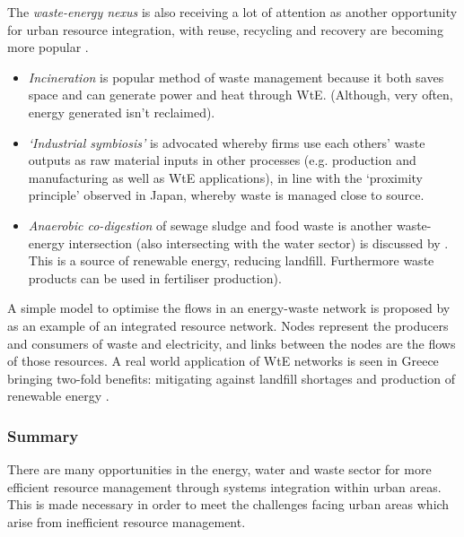 The \emph{waste-energy nexus} is also receiving a lot of attention as another opportunity for urban resource integration, with reuse, recycling and recovery are becoming more popular \citep{Geng2010}. 
\begin{itemize} 
	\item \emph{Incineration} is popular method of waste management because it both saves space and can generate power and heat through WtE. (Although, very often, energy generated isn't reclaimed).  
	\item \emph{`Industrial symbiosis'} is advocated whereby firms use each others' waste outputs as raw material inputs in other processes (e.g. production and manufacturing as well as WtE applications), in line with the `proximity principle' observed in Japan, whereby waste is managed close to source. %
	\item \emph{Anaerobic co-digestion} of sewage sludge and food waste is another waste-energy intersection (also intersecting with the water sector) is discussed by \citet{Iacovidou2012}. This is a source of renewable energy, reducing landfill. Furthermore waste products can be used in fertiliser production).
\end{itemize}
A simple model to optimise the flows in an energy-waste network is proposed by \citet{Kharrazi2012} as an example of an integrated resource network. Nodes represent the producers and consumers of waste and electricity, and links between the nodes are the flows of those resources. A real world application of WtE networks is seen in Greece bringing two-fold benefits: mitigating against landfill shortages and production of renewable energy \citep{Xydis2012}.

\subsubsection*{Summary}
There are many opportunities in the energy, water and waste sector for more efficient resource management through systems integration within urban areas. This is made necessary in order to meet the challenges facing urban areas which arise from inefficient resource management.
%
%
